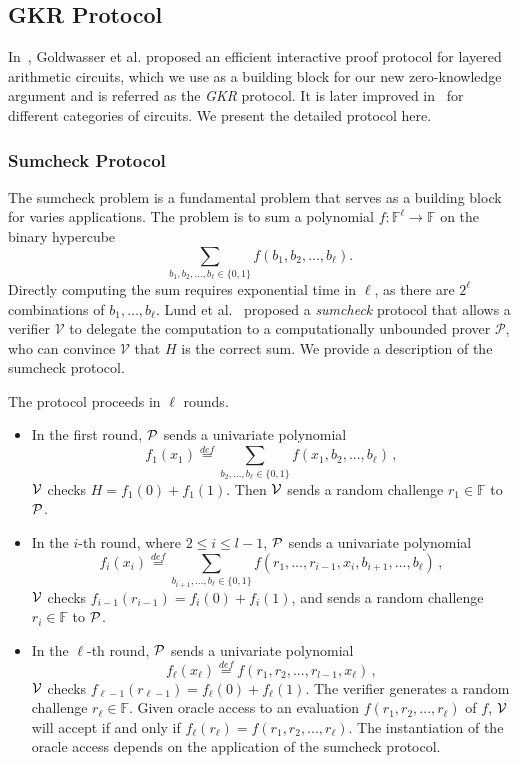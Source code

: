 
\subsection{GKR Protocol}\label{subsec::GKR}

In~\cite{GKR}, Goldwasser et al. proposed an efficient interactive proof protocol for layered arithmetic circuits, which we use as a building block for our new zero-knowledge argument and is referred as the \emph{GKR} protocol. It is later improved in~\cite{CMT,t13, vram, ...} for different categories of circuits. We present the detailed protocol here.



\subsubsection{Sumcheck Protocol}
\label{subsec::sumcheck}
The sumcheck problem is a fundamental problem that serves as a building block for varies applications. The problem is to sum a polynomial $f: \mathbb{F}^\ell \rightarrow \mathbb{F}$ on the binary hypercube $$\sum\limits_{b_1,b_2,\ldots,b_\ell\in\{0,1\}}f(b_1,b_2,...,b_\ell).$$ 
Directly computing the sum requires exponential time in $\ell$, as there are $2^\ell$ combinations of $b_1,\ldots,b_\ell$. Lund et al.~\cite{sumcheck} proposed a \emph{sumcheck} protocol that allows a verifier $\mathcal{V}$ to delegate the computation to a computationally unbounded prover $\mathcal{P}$, who can convince $\mathcal{V}$ that $H$ is the correct sum. We provide a description of the sumcheck protocol.

\begin{protocol}
	\label{prot::sumcheck}
	The protocol proceeds in $\ell$ rounds. 
	\begin{itemize}
		\item In the first round, $\P$ sends a univariate polynomial $$f_1(x_1)\overset{def}{=}\sum\limits_{b_2,\ldots,b_\ell\in\{0,1\}}f(x_1,b_2,...,b_\ell)\, ,$$ $\V$ checks $H=f_1(0)+f_1(1)$. Then $\V$ sends a random challenge $r_1\in\mathbb{F}$ to $\P$.
		\item In the $i$-th round, where $2\le i \le l-1$, $\P$ sends a univariate polynomial
		$$f_{i}(x_{i})\overset{def}{=}\sum\limits_{b_{i+1},\ldots,b_\ell\in\{0,1\}}f(r_1,\ldots, r_{i-1}, x_{i}, b_{i+1},\ldots, b_{\ell})\, ,$$ 
		$\V$ checks $f_{i-1}(r_{i-1})=f_{i}(0)+f_{i}(1)$, and sends a random challenge $r_{i}\in\mathbb{F}$ to $\P$.
		\item In the $\ell$-th round, $\P$ sends a univariate polynomial $$f_{\ell}(x_{\ell})\overset{def}{=}f(r_1, r_2, ..., r_{l-1}, x_{\ell})\, ,$$ $\V$ checks $f_{\ell-1}(r_{\ell-1})=f_{\ell}(0)+f_{\ell}(1)$. The verifier generates a random challenge $r_{\ell}\in\mathbb{F}$. Given oracle access to an evaluation $f(r_1, r_2, ..., r_\ell)$ of $f$, $\V$ will accept if and only if $f_{\ell}(r_\ell) = f(r_1, r_2, ..., r_\ell)$. The instantiation of the oracle access depends on the application of the sumcheck protocol.
	\end{itemize}
\end{protocol}

